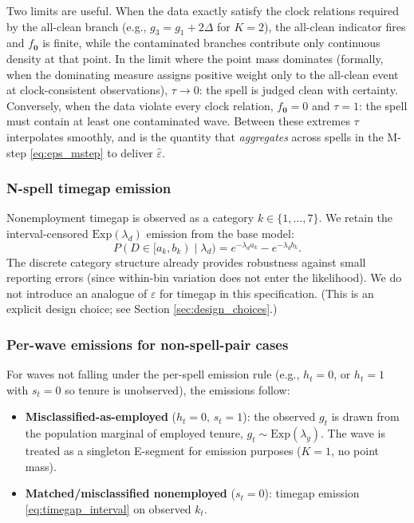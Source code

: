 Two limits are useful. When the data exactly satisfy the clock relations
required by the all-clean branch (e.g., \(g_3 = g_1 + 2\Delta\) for
\(K=2\)), the all-clean indicator fires and \(f_{\mathbf{0}}\) is
finite, while the contaminated branches contribute only continuous
density at that point. In the limit where the point mass dominates
(formally, when the dominating measure assigns positive weight only to
the all-clean event at clock-consistent observations),
\(\tau \to 0\): the spell is judged clean with certainty. Conversely,
when the data violate every clock relation, \(f_{\mathbf{0}} = 0\) and
\(\tau = 1\): the spell must contain at least one contaminated wave.
Between these extremes \(\tau\) interpolates smoothly, and is the
quantity that \emph{aggregates} across spells in the M-step
\eqref{eq:eps_mstep} to deliver \(\hat\varepsilon\).

\subsubsection{N-spell timegap emission}

Nonemployment timegap is observed as a category \(k \in \{1,\dots,7\}\).
We retain the interval-censored \(\mathrm{Exp}(\lambda_d)\) emission from
the base model:
\begin{equation}
P(D \in [a_k, b_k) \mid \lambda_d) = e^{-\lambda_d a_k} - e^{-\lambda_d b_k}.
\label{eq:timegap_interval}
\end{equation}
The discrete category structure already provides robustness against small
reporting errors (since within-bin variation does not enter the likelihood).
We do not introduce an analogue of \(\varepsilon\) for timegap in this
specification. (This is an explicit design choice; see Section
\ref{sec:design_choices}.)

\subsubsection{Per-wave emissions for non-spell-pair cases}

For waves not falling under the per-spell emission rule (e.g., \(h_t=0\),
or \(h_t=1\) with \(s_t=0\) so tenure is unobserved), the emissions follow:

\begin{itemize}
\item \textbf{Misclassified-as-employed} (\(h_t=0,\,s_t=1\)): the observed
  \(g_t\) is drawn from the population marginal of employed tenure,
  \(g_t \sim \mathrm{Exp}(\lambda_g)\). The wave is treated as a singleton
  E-segment for emission purposes (\(K=1\), no point mass).
\item \textbf{Matched/misclassified nonemployed} (\(s_t=0\)): timegap
  emission \eqref{eq:timegap_interval} on observed \(k_{t}\).
\end{itemize}

